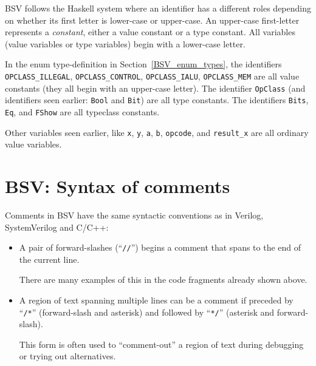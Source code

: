BSV follows the Haskell system where an identifier has a different
roles depending on whether its first letter is lower-case or
upper-case.  An upper-case first-letter represents a \emph{constant},
either a value constant or a type constant.  All variables (value
variables or type variables) begin with a lower-case letter.

In the enum type-definition in Section~\ref{BSV_enum_types}, the
identifiers \verb|OPCLASS_ILLEGAL|, \verb|OPCLASS_CONTROL|,
\verb|OPCLASS_IALU|, \verb|OPCLASS_MEM| are all value constants (they
all begin with an upper-case letter).  The identifier \verb|OpClass|
(and identifiers seen earlier: \verb|Bool| and \verb|Bit|) are all
type constants.  The identifiers \verb|Bits|, \verb|Eq|, and
\verb|FShow| are all typeclass constants.

Other variables seen earlier, like \verb|x|, \verb|y|, \verb|a|,
\verb|b|, \verb|opcode|, and \verb|result_x| are all ordinary value
variables.


\section{BSV: Syntax of comments}

\label{BSV_Syntax_of_comments}


Comments in BSV have the same syntactic conventions as in Verilog,
SystemVerilog and C/C++:

\begin{itemize}

  \item A pair of forward-slashes (``\verb|//|'') begins a comment
    that spans to the end of the current line.

    There are many examples of this in the code fragments already
    shown above.

  \item A region of text spanning multiple lines can be a comment if
    preceded by ``\verb|/*|'' (forward-slash and asterisk) and followed by
    ``\verb|*/|'' (asterisk and forward-slash).

    This form is often used to ``comment-out'' a region of text during
    debugging or trying out alternatives.

\end{itemize}

